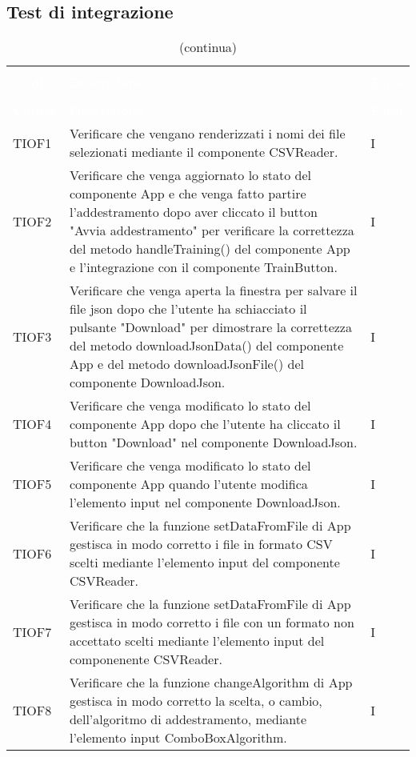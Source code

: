 \subsection{Test di integrazione}

\begin{longtable}{C{2cm} L{8cm} C{2cm}}
\caption{Tabella dei test di integrazione} \\
\textcolor{white}{\textbf{Codice}} &
\textcolor{white}{\textbf{Descrizione}} &
\textcolor{white}{\textbf{Esito}} \\
		\endfirsthead
		\caption[]{(continua)} \\
\textcolor{white}{\textbf{Codice}} &
\textcolor{white}{\textbf{Descrizione}} &
\textcolor{white}{\textbf{Esito}} \\
		\endhead
TIOF1 & Verificare che vengano renderizzati i nomi dei file selezionati mediante il componente CSVReader. & I \\
TIOF2 & Verificare che venga aggiornato lo stato del componente App e che venga fatto partire l’addestramento dopo aver cliccato il button "Avvia addestramento" per verificare la correttezza del metodo handleTraining() del componente App e l’integrazione con il componente TrainButton. & I \\
TIOF3 & Verificare che venga aperta la finestra per salvare il file json dopo che l’utente ha schiacciato il pulsante "Download" per dimostrare la correttezza del metodo downloadJsonData() del componente App e del metodo downloadJsonFile() del componente DownloadJson. & I \\
TIOF4 & Verificare che venga modificato lo stato del componente App dopo che l’utente ha cliccato il button "Download" nel componente DownloadJson. & I \\
TIOF5 & Verificare che venga modificato lo stato del componente App quando l’utente modifica l’elemento input nel componente DownloadJson. & I \\
TIOF6 & Verificare che la funzione setDataFromFile di App gestisca in modo corretto i file in formato CSV scelti mediante l’elemento input del componente CSVReader. & I \\
TIOF7 & Verificare che la funzione setDataFromFile di App gestisca in modo corretto i file con un formato non accettato scelti mediante l’elemento input del componenente CSVReader. & I \\
TIOF8 & Verificare che la funzione changeAlgorithm di App gestisca in modo corretto la scelta, o cambio, dell'algoritmo di addestramento, mediante l'elemento input ComboBoxAlgorithm. & I \\

\end{longtable}
